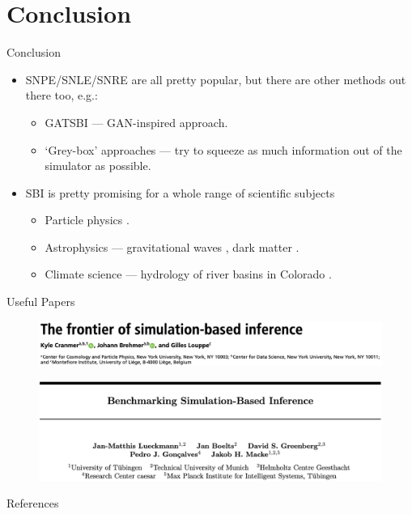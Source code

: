 \documentclass[12pt, aspectratio=169]{beamer}
\let\olditem\item
\renewcommand\item{\olditem\justifying}
\begin{document}
\section{Conclusion}
\begin{frame}{Conclusion}
\begin{itemize}[<+->]
    \item SNPE/SNLE/SNRE are all pretty popular, but there are other methods out there too, e.g.:
    \begin{itemize}
        \item GATSBI \parencite{ramesh_gatsbi_2022} --- GAN-inspired approach.
        \item `Grey-box' approaches \parencite{brehmer_mining_2020} --- try to squeeze as much information out of the simulator as possible.
    \end{itemize}
    \item SBI is pretty promising for a whole range of scientific subjects
    \begin{itemize}
        \item Particle physics \parencite{brehmer_simulation-based_2020}.
        \item Astrophysics --- gravitational waves \parencite{delaunoy_lightning-fast_2020}, dark matter \parencite{hermans_towards_2021}.
        \item Climate science --- hydrology of river basins in Colorado \cite{hull_using_2022}.
    \end{itemize}
\end{itemize}
\end{frame}

\begin{frame}{Useful Papers}
    \begin{figure}
        \centering
        \includegraphics[height=0.25\textheight]{"images/review_header.png"}
    \end{figure}
    
    \vspace{1em}
    
    \begin{figure}
        \centering
        \includegraphics[height=0.4\textheight]{"images/benchmarking_header2.png"}
    \end{figure}
\end{frame}

\begin{frame}[allowframebreaks]{References}
    \printbibliography
\end{frame}
\end{document}
